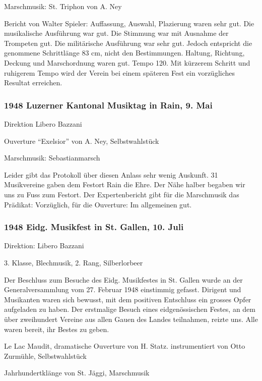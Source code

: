 \begin{history}
    Marschmusik: St. Triphon von A. Ney

    Bericht von Walter Spieler: Auffassung, Auswahl, Plazierung waren sehr gut.
    Die musikalische Ausführung war gut. Die Stimmung war mit Ausnahme der
    Trompeten gut. Die militärische Ausführung war sehr gut. Jedoch entspricht
    die genommene Schrittlänge 83 cm, nicht den Bestimmungen. Haltung, Richtung,
    Deckung und Marschordnung waren gut. Tempo 120. Mit kürzerem Schritt und
    ruhigerem Tempo wird der Verein bei einem späteren Fest ein vorzügliches
    Resultat erreichen.

    \subsubsection*{1948 Luzerner Kantonal Musiktag in Rain, 9. Mai}

    Direktion Libero Bazzani

    Ouverture \enquote{Exelsior} von A. Ney, Selbstwahlstück

    Marschmusik: Sebastianmarsch

    Leider gibt das Protokoll über diesen Anlass sehr wenig Auskunft. 31
    Musikvereine gaben dem Festort Rain die Ehre. Der Nähe halber begaben wir
    uns zu Fuss zum Festort. Der Expertenbericht gibt für die Marschmusik das
    Prädikat: Vorzüglich, für die Ouverture: Im allgemeinen gut.


    \subsubsection*{1948 Eidg. Musikfest in St. Gallen, 10. Juli}

    Direktion: Libero Bazzani

    3. Klasse, Blechmusik, 2. Rang, Silberlorbeer

    Der Beschluss zum Besuche des Eidg. Musikfestes in St. Gallen wurde an der
    Generalversammlung vom 27. Februar 1948 einstimmig gefasst. Dirigent und
    Musikanten waren sich bewusst, mit dem positiven Entschluss ein grosses
    Opfer aufgeladen zu haben. Der erstmalige Besuch eines eidgenössischen
    Festes, an dem über zweihundert Vereine aus allen Gauen des Landes
    teilnahmen, reizte uns. Alle waren bereit, ihr Bestes zu geben.

    Le Lac Maudit, dramatische Ouverture von H. Statz. instrumentiert von Otto
    Zurmühle, Selbstwahlstück

    Jahrhundertklänge von St. Jäggi, Marschmusik


\end{history}

